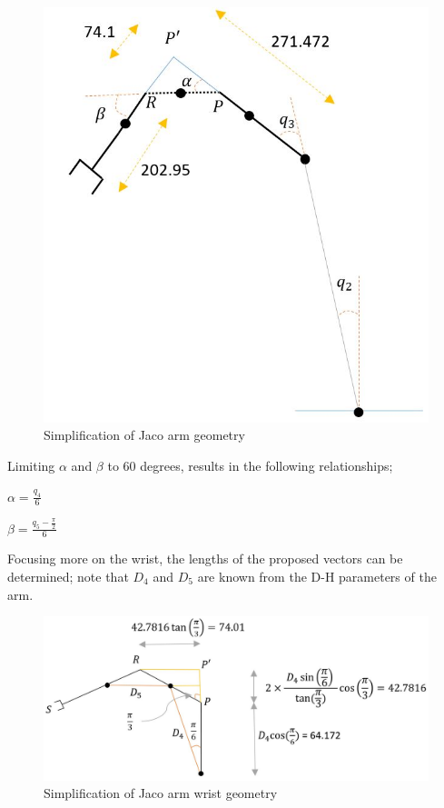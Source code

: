 \documentclass[12pt,openany,a4paper]{book}
\begin{document}
\begin{center}
\begin{figure}[htb]
  \includegraphics[width=0.8\linewidth]{jaco_inv_figure.jpg}
\caption{Simplification of Jaco arm geometry}
\end{figure}
\end{center}

Limiting $\alpha$ and $\beta$ to 60 degrees, results in the following relationships;

\vspace{\baselineskip}
\begin{center}
$\alpha = \frac{q_4}{6}$

\vspace{\baselineskip}

$\beta	= \frac{q_5 - \frac{\pi}{2}}{6}$
\end{center}

\vspace{\baselineskip}
Focusing more on the wrist, the lengths of the proposed vectors can be determined; note that $D_4$ and $D_5$ are known from the D-H parameters of the arm.

\clearpage

\begin{center}
\begin{figure}[htb]
  \includegraphics[width=0.9\linewidth]{jaco_inv_wrist_figure.jpg}
\caption{Simplification of Jaco arm wrist geometry}
\end{figure}
\end{center}
\end{document}
